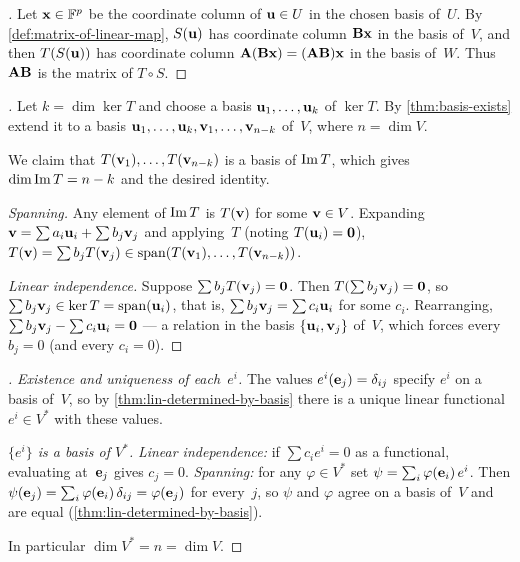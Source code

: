 \begin{proof}[]
Let $\mathbf{x} \in \mathbb{F}^p$ be the coordinate column of $\mathbf{u} \in U$
in the chosen basis of~$U$. By
\cref{def:matrix-of-linear-map}, $S(\mathbf{u})$ has coordinate column
$\mathbf{B}\mathbf{x}$ in the basis of~$V$, and then $T(S(\mathbf{u}))$ has
coordinate column $\mathbf{A}(\mathbf{B}\mathbf{x}) = (\mathbf{A}\mathbf{B})\mathbf{x}$
in the basis of~$W$. Thus $\mathbf{A}\mathbf{B}$ is the matrix of
$T \circ S$.
\end{proof}

\begin{proof}[]
Let $k = \dim \ker T$ and choose a basis
$\mathbf{u}_1, \dots, \mathbf{u}_k$ of $\ker T$. By
\cref{thm:basis-exists} extend it to a basis
$\mathbf{u}_1, \dots, \mathbf{u}_k, \mathbf{v}_1, \dots, \mathbf{v}_{n-k}$
of~$V$, where $n = \dim V$.

We claim that $T(\mathbf{v}_1), \dots, T(\mathbf{v}_{n-k})$ is a basis
of $\operatorname{Im} T$, which gives $\dim \operatorname{Im} T = n - k$ and the desired identity.

\emph{Spanning.} Any element of $\operatorname{Im} T$ is $T(\mathbf{v})$ for some
$\mathbf{v} \in V$. Expanding
$\mathbf{v} = \sum a_i \mathbf{u}_i + \sum b_j \mathbf{v}_j$ and applying~$T$
(noting $T(\mathbf{u}_i) = \mathbf{0}$),
$T(\mathbf{v}) = \sum b_j T(\mathbf{v}_j) \in \operatorname{span}(T(\mathbf{v}_1), \dots, T(\mathbf{v}_{n-k}))$.

\emph{Linear independence.} Suppose
$\sum b_j T(\mathbf{v}_j) = \mathbf{0}$. Then
$T(\sum b_j \mathbf{v}_j) = \mathbf{0}$, so
$\sum b_j \mathbf{v}_j \in \ker T = \operatorname{span}(\mathbf{u}_i)$, that is,
$\sum b_j \mathbf{v}_j = \sum c_i \mathbf{u}_i$ for some $c_i$. Rearranging,
$\sum b_j \mathbf{v}_j - \sum c_i \mathbf{u}_i = \mathbf{0}$ — a relation in
the basis $\{\mathbf{u}_i, \mathbf{v}_j\}$ of~$V$, which forces every
$b_j = 0$ (and every $c_i = 0$).
\end{proof}

\begin{proof}[]
\emph{Existence and uniqueness of each~$e^i$.} The values
$e^i(\mathbf{e}_j) = \delta_{ij}$ specify $e^i$ on a basis of~$V$, so by
\cref{thm:lin-determined-by-basis} there is a unique linear functional
$e^i \in V^{*}$ with these values.

\emph{$\{e^i\}$ is a basis of $V^{*}$.}
\textit{Linear independence:} if $\sum c_i e^i = 0$ as a functional,
evaluating at~$\mathbf{e}_j$ gives $c_j = 0$.
\textit{Spanning:} for any $\varphi \in V^{*}$ set
$\psi = \sum_i \varphi(\mathbf{e}_i)\, e^i$. Then
$\psi(\mathbf{e}_j) = \sum_i \varphi(\mathbf{e}_i)\, \delta_{ij} = \varphi(\mathbf{e}_j)$
for every~$j$, so $\psi$ and $\varphi$ agree on a basis of~$V$ and are
equal (\cref{thm:lin-determined-by-basis}).

In particular $\dim V^{*} = n = \dim V$.
\end{proof}

